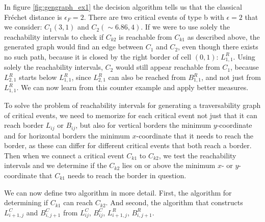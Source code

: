 In figure \ref{fig:gengraph_ex1} the decision algorithm tells us that the classical Fréchet distance is $\epsilon_F = 2$. There are two critical events of type b with $\epsilon = 2$ that we consider: $C_1(3, 1)$ and $C_2(\sim6.86, 4)$. If we were to use solely the reachability intervals to check if $C_{k2}$ is reachable from $C_{k1}$ as described above, the generated graph would find an edge between $C_1$ and $C_2$, even though there exists no such path, because it is closed by the right border of cell $(0, 1)$: $L_{1, 1}^R$. Using solely the reachability intervals, $C_2$ would still appear reachable from $C_1$, because $L_{2, 1}^R$ starts below $L_{1, 1}^R$, since $L_{2, 1}^R$ can also be reached from $B_{1,1}^R$, and not just from $L_{1, 1}^R$. We can now learn from this counter example and apply better measures.

To solve the problem of reachability intervals for generating a traversability graph of critical events, we need to memorize for each critical event not just that it can reach border $L_{ij}$ or $B_{ij}$, but also for vertical borders the minimum $y$-coordinate and for horizontal borders the minimum $x$-coordinate that it needs to reach the border, as these can differ for different critical events that both reach a border. Then when we connect a critical event $C_{k1}$ to $C_{k2}$, we test the reachability intervals and we determine if the $C_{k2}$ lies on or above the minimum $x$- or $y$-coordinate that $C_{k1}$ needs to reach the border in question.

We can now define two algorithm in more detail. First, the algorithm for determining if $C_{k1}$ can reach $C_{k2}$. And second, the algorithm that constructs $L_{i+1, j}^C$ and $B_{i, j+1}^C$ from $L_{ij}^C$, $B_{ij}^C$, $L_{i+1, j}^R$, $B_{i, j+1}^R$.

